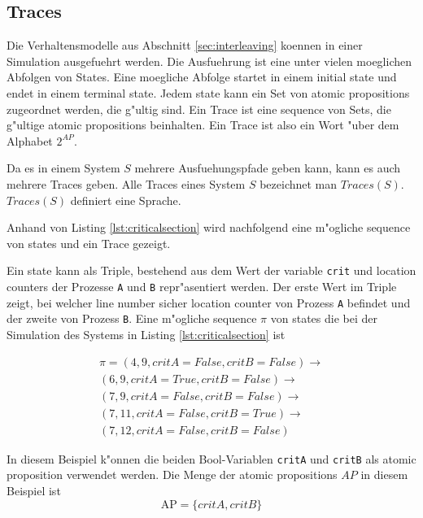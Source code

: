 \documentclass[a4paper, twoside]{article}
\begin{document}
\subsection{Traces}
\label{sec:traces}

Die Verhaltensmodelle aus Abschnitt \ref{sec:interleaving} koennen in einer Simulation ausgefuehrt werden. Die Ausfuehrung ist eine unter vielen moeglichen Abfolgen von States. Eine moegliche Abfolge startet in einem initial state und endet in einem terminal state. Jedem state kann ein Set von atomic propositions zugeordnet werden, die g"ultig sind. Ein Trace ist eine sequence von Sets, die g"ultige atomic propositions beinhalten. Ein Trace ist also ein Wort "uber dem Alphabet $2^{AP}$.

Da es in einem System $S$ mehrere Ausfuehungspfade geben kann, kann es auch mehrere Traces geben. Alle Traces eines System $S$ bezeichnet man $Traces(S)$. $Traces(S)$ definiert eine Sprache.

Anhand von Listing \ref{lst:criticalsection} wird nachfolgend eine m"ogliche sequence von states und ein Trace gezeigt.



Ein state kann als Triple, bestehend aus dem Wert der variable \verb|crit| und location counters der Prozesse \verb|A| und \verb|B| repr"asentiert werden. Der erste Wert im Triple zeigt, bei welcher line number sicher location counter von Prozess \verb|A| befindet und der zweite von Prozess \verb|B|.
Eine m"ogliche sequence $\pi$ von states die bei der Simulation des Systems in Listing \ref{lst:criticalsection} ist

\begin{equation}
  \label{eq:path}
  \begin{split}
\pi = (4, 9, {critA}={False},{critB}=False) \rightarrow \\
(6, 9, {critA}={True},{critB}=False) \rightarrow \\
(7, 9, {critA}={False},{critB}=False) \rightarrow \\
(7, 11, {critA}={False},{critB}=True) \rightarrow \\
(7, 12, {critA}={False},{critB}=False)
  \end{split}
\end{equation}

In diesem Beispiel k"onnen die beiden Bool-Variablen \verb|critA| und \verb|critB| als atomic proposition verwendet werden. Die Menge der atomic propositions $AP$ in diesem Beispiel ist
\[
\text{AP}=\{critA, critB\}
\]
\end{document}
